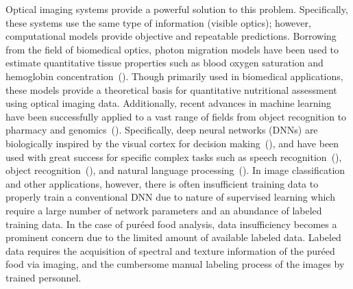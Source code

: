 \documentclass[authoryear]{elsarticle}
\begin{document}
Optical imaging systems provide a powerful solution to this problem. Specifically, these systems use the same type of information (visible optics); however, computational models provide objective and repeatable predictions. Borrowing from the field of biomedical optics, photon migration models have been used to estimate quantitative tissue properties such as blood oxygen saturation and hemoglobin concentration~(\cite{bigio2016}). Though primarily used in biomedical applications, these models provide a theoretical basis for quantitative nutritional assessment using optical imaging data. Additionally, recent advances in machine learning have been successfully applied to a vast range of fields from object recognition to pharmacy and genomics~(\cite{lecun2015}). Specifically, deep neural networks (DNNs) are biologically inspired by the visual cortex for decision making~(\cite{bengio2009}), and have been used with great success for specific complex tasks such as speech recognition~(\cite{hinton2012, dahl2012, hannun2014}), object recognition~(\cite{krizhevsky2012, he2015, lecun2004, simonyan2014}), and natural language processing~(\cite{bengio2003, collobert2008}). In image classification and other applications, however, there is often insufficient training data to properly train a conventional DNN due to nature of supervised learning which require a large number of network parameters and an abundance of labeled training data. In the case of pur\' eed food analysis, data insufficiency becomes a prominent concern due to the limited amount of available labeled data. Labeled data requires the acquisition of spectral and texture information of the pur\' eed food via imaging, and the cumbersome manual labeling process of the images by trained personnel. 
\end{document}
